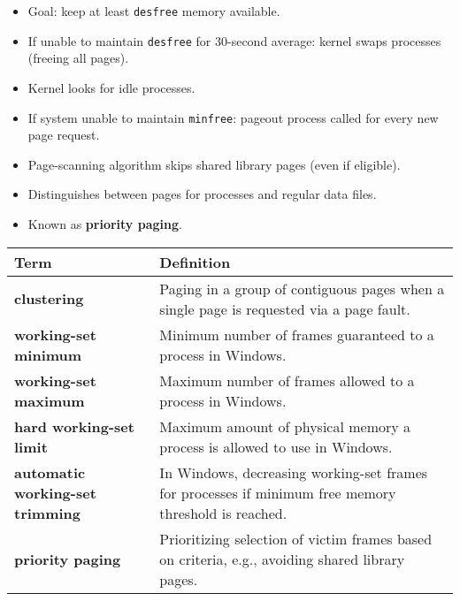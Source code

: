 \begin{itemize}
    \item Goal: keep at least \texttt{desfree} memory available.
    \item If unable to maintain \texttt{desfree} for 30-second average: kernel swaps processes (freeing all pages).
    \item Kernel looks for idle processes.
    \item If system unable to maintain \texttt{minfree}: pageout process called for every new page request.
    \item Page-scanning algorithm skips shared library pages (even if eligible).
    \item Distinguishes between pages for processes and regular data files.
    \item Known as \textbf{priority paging}.
\end{itemize}

\vspace{1em}
\begin{tabular}{p{}p{}}
\toprule
\rowcolor{lightgray} \textbf{Term} & \textbf{Definition} \\
\midrule
\textbf{clustering} & Paging in a group of contiguous pages when a single page is requested via a page fault. \\
\textbf{working-set minimum} & Minimum number of frames guaranteed to a process in Windows. \\
\textbf{working-set maximum} & Maximum number of frames allowed to a process in Windows. \\
\textbf{hard working-set limit} & Maximum amount of physical memory a process is allowed to use in Windows. \\
\textbf{automatic working-set trimming} & In Windows, decreasing working-set frames for processes if minimum free memory threshold is reached. \\
\textbf{priority paging} & Prioritizing selection of victim frames based on criteria, e.g., avoiding shared library pages. \\
\bottomrule
\end{tabular}
